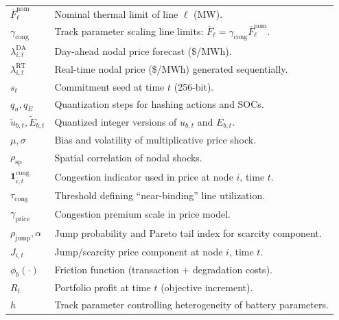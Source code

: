 \documentclass[11pt]{article}
\begin{document}
\begin{longtable}{@{}>{\raggedright\arraybackslash}p{}p{}@{}}
$\overline{F}^{\mathrm{nom}}_\ell$ & Nominal thermal limit of line $\ell$ (MW). \\
$\gamma_{\mathrm{cong}}$ & Track parameter scaling line limits: $\overline{F}_\ell=\gamma_{\mathrm{cong}}\overline{F}^{\mathrm{nom}}_\ell$. \\
$\lambda^{\mathrm{DA}}_{i,t}$ & Day-ahead nodal price forecast (\$/MWh). \\
$\lambda^{\mathrm{RT}}_{i,t}$ & Real-time nodal price (\$/MWh) generated sequentially. \\
$s_t$ & Commitment seed at time $t$ (256-bit). \\
$q_u,q_E$ & Quantization steps for hashing actions and SOCs. \\
$\tilde{u}_{b,t},\tilde{E}_{b,t}$ & Quantized integer versions of $u_{b,t}$ and $E_{b,t}$. \\
$\mu,\sigma$ & Bias and volatility of multiplicative price shock. \\
$\rho_{\mathrm{sp}}$ & Spatial correlation of nodal shocks. \\
$\mathbf{1}^{\mathrm{cong}}_{i,t}$ & Congestion indicator used in price at node $i$, time $t$. \\
$\tau_{\mathrm{cong}}$ & Threshold defining ``near-binding'' line utilization. \\
$\gamma_{\mathrm{price}}$ & Congestion premium scale in price model. \\
$\rho_{\mathrm{jump}},\alpha$ & Jump probability and Pareto tail index for scarcity component. \\
$J_{i,t}$ & Jump/scarcity price component at node $i$, time $t$. \\
$\phi_b(\cdot)$ & Friction function (transaction + degradation costs). \\
$R_t$ & Portfolio profit at time $t$ (objective increment). \\
$h$ & Track parameter controlling heterogeneity of battery parameters. \\

\end{longtable}
\end{document}
